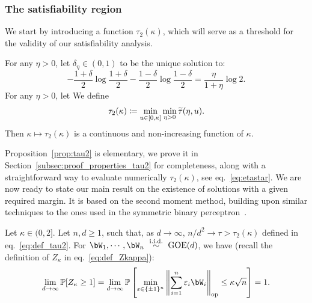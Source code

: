\subsubsection{The satisfiability region}

We start by introducing a function $\tau_2(\kappa)$, which will serve as a threshold for the validity of our satisfiability analysis.
\begin{proposition}\label{prop:tau2}
   For any $\eta > 0$, let $\delta_\eta \in (0,1)$ to be the unique solution to:
    \begin{equation}
        \label{eq:def_delta_eta}
        - \frac{1+\delta}{2} \log \frac{1+\delta}{2} - \frac{1-\delta}{2} \log \frac{1-\delta}{2} = \frac{\eta}{1+\eta} \log 2.  
    \end{equation}
    For any $\eta > 0$, let 
    We define
    \begin{equation}
        \label{eq:def_tau2}
        \tau_2(\kappa) \coloneqq \min_{u \in [0,\kappa]} \min_{\eta > 0} {\widetilde{\tau}}(\eta, u).
    \end{equation}
    Then $\kappa \mapsto \tau_2(\kappa)$ is a continuous and non-increasing function of $\kappa$.
\end{proposition}
\noindent
Proposition~\ref{prop:tau2} is elementary, we prove it in Section~\ref{subsec:proof_properties_tau2} for completeness, along 
with a straightforward way to evaluate numerically $\tau_2(\kappa)$, see eq.~\eqref{eq:etastar}.
We are now ready to state our main result on the existence of solutions with a given required margin.
It is based on the second moment method, building upon similar techniques to the ones used in the symmetric binary perceptron~\citep{aubin2019storage}.
\begin{theorem}\label{thm:second_moment}
    Let $\kappa \in (0, 2]$. 
    Let $n,d \geq 1$, such that, as $d \to \infty$, $n/d^2 \to \tau > \tau_2(\kappa)$ defined in eq.~\eqref{eq:def_tau2}. 
    For $\bW_1, \cdots, \bW_n~\iid~\GOE(d)$, we have (recall the definition of $Z_\kappa$ in eq.~\eqref{eq:def_Zkappa}):
    \begin{equation*}
        \lim_{d \to \infty} \bbP[Z_\kappa \geq 1] = \lim_{d \to \infty} \bbP\left[\min_{\eps \in \{\pm 1\}^n} \left\|\sum_{i=1}^n \eps_i \bW_i \right\|_\op \leq \kappa \sqrt{n}\right] = 1.
    \end{equation*} 
\end{theorem}
